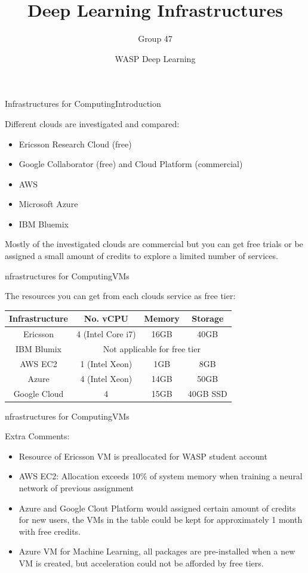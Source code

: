 \documentclass{beamer}
\title{Deep Learning Infrastructures}
\date{WASP Deep Learning}
\author[Agents 47]{Group 47}
\begin{document}
\begin{frame}
  \titlepage
\end{frame}


\begin{frame}{Infrastructures for Computing}{Introduction}

Different clouds are investigated and compared:
\begin{itemize}
	\item Ericsson Research Cloud (free)
	\item Google Collaborator (free) and Cloud Platform (commercial)
	\item AWS
	\item Microsoft Azure
	\item IBM Bluemix 
\end{itemize}
Mostly of the investigated clouds are commercial  but you can get free trials or be assigned a small amount of credits to explore a limited number of services.   
\end{frame}

\begin{frame}{nfrastructures for Computing}{VMs }

The resources you can get from each clouds service as free tier:
\begin{table}[H]
	\begin{tabular}{|c|c|c|c|}
		\hline
		Infrastructure & No. vCPU&Memory&Storage\\
		\hline
		Ericsson & 4 (Intel Core i7) & 16GB & 40GB\\
		\hline
		IBM Blumix & \multicolumn{3}{c|}{Not applicable for free tier } \\
		\hline
		AWS EC2 & 1 (Intel Xeon)& 1GB& 8GB\\
		\hline
		Azure& 4 (Intel Xeon)& 14GB & 50GB \\
		\hline
		Google Cloud& 4 & 15GB & 40GB SSD\\
		\hline
	\end{tabular}
\end{table}


\end{frame}

\begin{frame}{nfrastructures for Computing}{VMs}

Extra Comments:
\begin{itemize}
	\item Resource of Ericsson VM is preallocated for WASP student account
	\item AWS EC2: Allocation exceeds 10\% of system memory when training a neural network of previous assignment 
	\item Azure and Google Clout Platform would assigned certain amount of credits for new users, the VMs in the table could be kept for approximately 1 month with free credits.
	\item Azure VM for Machine Learning, all packages are pre-installed when a new VM is created, but acceleration could not be afforded by free tiers. 
\end{itemize}

\end{frame}
\end{document}
